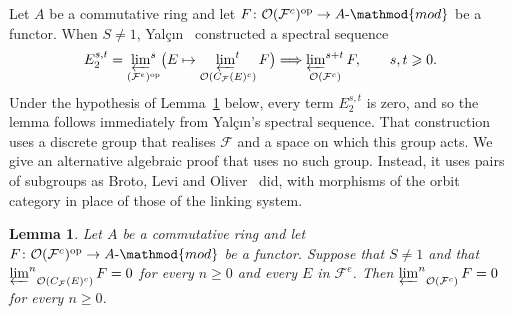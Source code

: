 \documentclass[10pt]{amsart}
\newtheorem{lemma}[theorem]{Lemma}
\theoremstyle{definition}
\numberwithin{equation}{section}
\renewcommand{\ge}{\geqslant}
\newcommand{\F}{\mathcal F}
\newcommand{\Op}{\mathcal O}
\newcommand{\limi}[2]{\mathop{\varprojlim\nolimits^{#1}}_{#2}}
\begin{document}
Let $A$ be a commutative ring and let $F\colon\Op(\F^c)^{\mathrm{op}}\to A\text{-}\mathmod{mod}$ be a functor. When $S\ne1$, Yal\c{c}\i{}n~\cite[Lemma~9.3 and Theorem~9.4]{Yalcin} constructed a spectral sequence
\[
E_2^{s,t}=\limi{s}{(\F^e)^{\mathrm{op}}}\bigl(E\mapsto\limi{t}{\Op(C_\F(E)^c)}F\bigr)\Longrightarrow\limi{s+t}{\Op(\F^c)}F,\qquad s,t\ge0.
\]
Under the hypothesis of Lemma~\ref{lem:detection} below, every term $E_2^{s,t}$ is zero, and so the lemma follows immediately from Yal\c{c}\i{}n's spectral sequence. That construction uses a discrete group that realises $\F$ and a space on which this group acts. We give an alternative algebraic proof that uses no such group. Instead, it uses pairs of subgroups as Broto, Levi and Oliver~\cite[proof of Theorem~2.6]{BLO} did, with morphisms of the orbit category in place of those of the linking system.

\begin{lemma}\label{lem:detection}
Let $A$ be a commutative ring and let $F\colon\Op(\F^c)^{\mathrm{op}}\to A\text{-}\mathmod{mod}$ be a functor. Suppose that $S\ne1$ and that $\limi{n}{\Op(C_\F(E)^c)}F=0$ for every $n\ge0$ and every $E$ in $\F^e$. Then $\limi{n}{\Op(\F^c)}F=0$ for every $n\ge0$.
\end{lemma}
\end{document}
